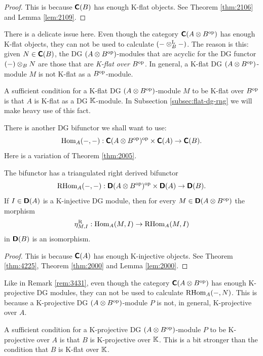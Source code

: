 \begin{proof}
This is because $\boldsymbol{\mathsf{C}}(B)$ has enough K-flat objects. See
Theorem \ref{thm:2106} and Lemma \ref{lem:2109}.
\end{proof}

\begin{rem} \label{rem:3431}
There is a delicate issue here. Even though the category 
$\boldsymbol{\mathsf{C}}(A \otimes B^{\mathrm{op}})$ has enough K-flat objects, 
they can not be used to calculate $(- \otimes^{\mathrm{L}}_{B} -)$. 
The reason is this: given $N \in \boldsymbol{\mathsf{C}}(B)$,
the DG $(A \otimes B^{\mathrm{op}})$-modules that are acyclic 
for the DG functor $(-) \otimes_B N$ are those that are 
{\em K-flat over $B^{\mathrm{op}}$}. In general, a K-flat DG 
$(A \otimes B^{\mathrm{op}})$-module $M$ is not K-flat as a $B^{\mathrm{op}}$-module. 

A sufficient condition for a K-flat DG $(A \otimes B^{\mathrm{op}})$-module 
$M$ to be K-flat over $B^{\mathrm{op}}$ is that $A$ is K-flat as a DG 
$\mathbb{K}$-module. In Subsection \ref{subsec:flat-dg-rng} we will make heavy use of 
this fact. 
\end{rem}

There is another DG bifunctor we shall want to use:
\begin{equation} \label{eqn:3538}
\operatorname{Hom}_A(-, -) :  \boldsymbol{\mathsf{C}}(A \otimes B^{\mathrm{op}})^{\mathrm{op}} \times 
\boldsymbol{\mathsf{C}}(A) \to \boldsymbol{\mathsf{C}}(B)  . 
\end{equation}
Here is a variation of Theorem \ref{thm:2005}. 

\begin{prop} \label{prop:3536}
The bifunctor \tup{(\ref{eqn:3538})} has a triangulated right derived 
bifunctor
\[ \operatorname{RHom}_A(-, -) :
\boldsymbol{\mathsf{D}}(A \otimes B^{\mathrm{op}})^{\mathrm{op}} \times \boldsymbol{\mathsf{D}}(A)
\to \boldsymbol{\mathsf{D}}(B) . \]
If $I \in \boldsymbol{\mathsf{D}}(A)$ is a K-injective DG module, then for every 
$M \in \boldsymbol{\mathsf{D}}(A \otimes B^{\mathrm{op}})$
the morphism 
\[ \eta^{\mathrm{R}}_{M, I} : \operatorname{Hom}_A(M, I) \to \operatorname{RHom}_A(M, I) \]
in $\boldsymbol{\mathsf{D}}(B)$ is an isomorphism. 
\end{prop}

\begin{proof}
This is because $\boldsymbol{\mathsf{C}}(A)$ has enough K-injective objects. See
Theorem \ref{thm:4225}, Theorem \ref{thm:2000} and 
Lemma \ref{lem:2000}.
\end{proof}

\begin{rem} \label{rem:3432}
Like in Remark \ref{rem:3431}, even though the category 
$\boldsymbol{\mathsf{C}}(A \otimes  B^{\mathrm{op}})$ has enough K-projective 
DG modules, they can not be used to calculate \lb $\operatorname{RHom}_A(-, N)$. 
This is because a K-projective DG $(A \otimes  B^{\mathrm{op}})$-module $P$ is 
not, in general, K-projective over $A$. 

A sufficient condition for a K-projective DG $(A \otimes B^{\mathrm{op}})$-module 
$P$ to be K-projective over $A$ is that $B$ is K-projective over $\mathbb{K}$. 
This is a bit stronger than the condition that $B$ is K-flat over $\mathbb{K}$.
\end{rem}

